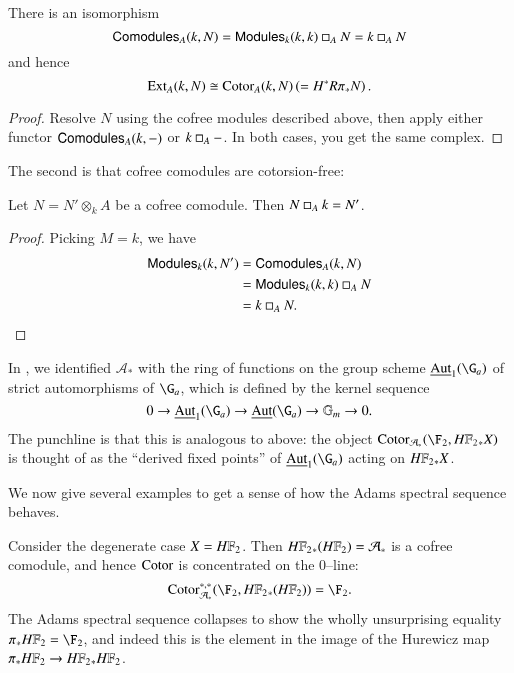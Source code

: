 \begin{corollary}\label{ExtAndCotorAgree}
There is an isomorphism \[\mathsf{Comodules}_A(k, N) = \mathsf{Modules}_k(k, k) \mathbin\square_A N = k \mathbin\square_A N\] and hence \[\operatorname{Ext}_A(k, N) \cong \operatorname{Cotor}_A(k, N) \left(= H^* R\pi_* N\right).\]
\end{corollary}
\begin{proof}
Resolve $N$ using the cofree modules described above, then apply either functor $\mathsf{Comodules}_A(k, -)$ or $k \mathbin\square_A -$.  In both cases, you get the same complex.
\end{proof}

\noindent The second is that cofree comodules are cotorsion-free:

\begin{corollary}\label{CotensorReducesCofreeness}
Let $N = N' \otimes_k A$ be a cofree comodule. Then $N \mathbin\square_A k = N'$.
\end{corollary}
\begin{proof}
Picking $M = k$, we have
\begin{align*}
\mathsf{Modules}_k(k, N') & = \mathsf{Comodules}_A(k, N) \\
& = \mathsf{Modules}_k(k, k) \mathbin\square_A N \\
& = k \mathbin\square_A N. \qedhere
\end{align*}
\end{proof}

\begin{example}\label{HF2HomologyIsValuedInAutGaEquivarModules}
In , we identified $\mathcal A_*$ with the ring of functions on the group scheme $\InternalAut_1(\G_a)$ of strict automorphisms of $\G_a$, which is defined by the kernel sequence \[0 \to \InternalAut_1(\G_a) \to \InternalAut(\G_a) \to \Gm \to 0.\]  The punchline is that this is analogous to  above: the object $\Cotor_{\mathcal A_*}(\F_2, \HFtwo_* X)$ is thought of as the ``derived fixed points'' of $\InternalAut_1(\G_a)$ acting on $\HFtwo_* X$.
\end{example}

We now give several examples to get a sense of how the Adams spectral sequence behaves.

\begin{example}
Consider the degenerate case $X = \HFtwo$.  Then $\HFtwo_*(\HFtwo) = \mathcal A_*$ is a cofree comodule, and hence $\operatorname{Cotor}$ is concentrated on the $0$--line: \[\Cotor_{\mathcal A_*}^{*, *}(\F_2, \HFtwo_*(\HFtwo)) = \F_2.\]  The Adams spectral sequence collapses to show the wholly unsurprising equality $\pi_* \HFtwo = \F_2$, and indeed this is the element in the image of the Hurewicz map $\pi_* \HFtwo \to \HFtwo_* \HFtwo$.
\end{example}


